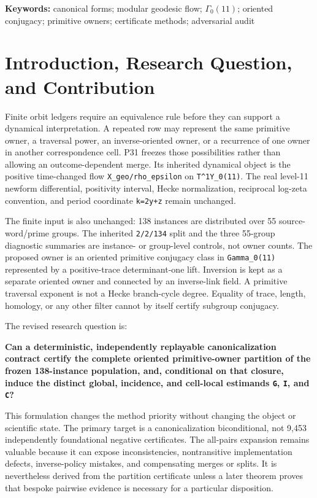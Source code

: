 \documentclass[11pt]{article}
\begin{document}
\noindent\textbf{Keywords:} canonical forms; modular geodesic flow;
$\Gamma_0(11)$; oriented conjugacy; primitive owners; certificate methods;
adversarial audit

\medskip
{}

\hypertarget{1-introduction-research-question-and-contribution}{%
\section{Introduction, Research Question, and
Contribution}\label{1-introduction-research-question-and-contribution}}

Finite orbit ledgers require an equivalence rule before they can support
a dynamical interpretation. A repeated row may represent the same
primitive owner, a traversal power, an inverse-oriented owner, or a
recurrence of one owner in another correspondence cell. P31 freezes
those possibilities rather than allowing an outcome-dependent merge. Its
inherited dynamical object is the positive time-changed flow
\texttt{X\_geo/rho\_epsilon} on \texttt{T\^{}1Y\_0(11)}. The real
level-11 newform differential, positivity interval, Hecke normalization,
reciprocal log-zeta convention, and period coordinate \texttt{k=2y+z}
remain unchanged.

The finite input is also unchanged: 138 instances are distributed over
55 source-word/prime groups. The inherited \texttt{2/2/134} split and
the three 55-group diagnostic summaries are instance- or group-level
controls, not owner counts. The proposed owner is an oriented primitive
conjugacy class in \texttt{Gamma\_0(11)} represented by a positive-trace
determinant-one lift. Inversion is kept as a separate oriented owner and
connected by an inverse-link field. A primitive traversal exponent is
not a Hecke branch-cycle degree. Equality of trace, length, homology, or
any other filter cannot by itself certify subgroup conjugacy.

The revised research question is:

\textbf{Can a deterministic, independently replayable canonicalization
contract certify the complete oriented primitive-owner partition of the
frozen 138-instance population, and, conditional on that closure, induce
the distinct global, incidence, and cell-local estimands \texttt{G},
\texttt{I}, and \texttt{C}?}

This formulation changes the method priority without changing the object
or scientific state. The primary target is a canonicalization
biconditional, not 9,453 independently foundational negative
certificates. The all-pairs expansion remains valuable because it can
expose inconsistencies, nontransitive implementation defects,
inverse-policy mistakes, and compensating merges or splits. It is
nevertheless derived from the partition certificate unless a later
theorem proves that bespoke pairwise evidence is necessary for a
particular disposition.
\end{document}
